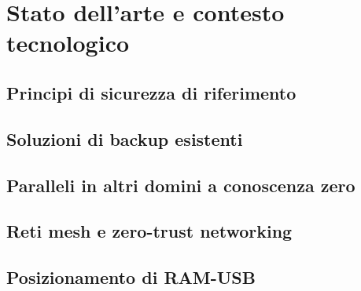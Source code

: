 \chapter{Stato dell'arte e contesto tecnologico}

\section{Principi di sicurezza di riferimento}

\section{Soluzioni di backup esistenti}

\section{Paralleli in altri domini a conoscenza zero}

\section{Reti mesh e zero-trust networking}

\section{Posizionamento di RAM-USB}
